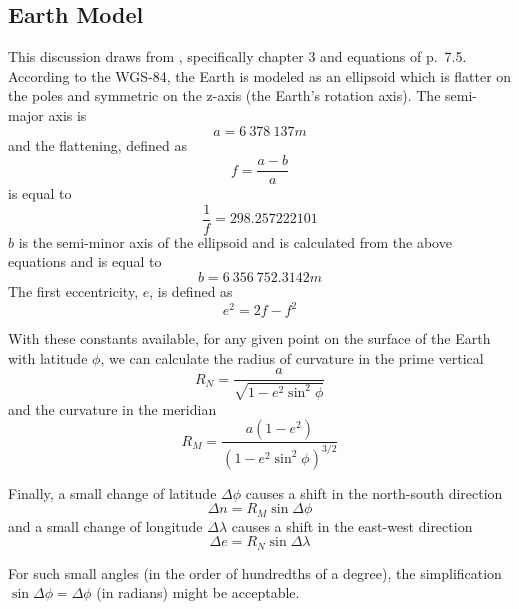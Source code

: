 \subsection{Earth Model}
This discussion draws from \cite{Mulaire2000}, specifically chapter 3 and equations of p.~7.5.
According to the WGS-84, the Earth is modeled as an ellipsoid which is flatter on the poles and symmetric on the z-axis (the Earth's rotation axis). The semi-major axis is
\begin{equation}\label{eq:majorAxis}
	a=6~378~137m
\end{equation}
and the flattening, defined as
\begin{equation}
	f = \frac{a-b}{a}
\end{equation}
is equal to
\begin{equation}
	\frac{1}{f} = 298.257222101
\end{equation}
$b$ is the semi-minor axis of the ellipsoid and is calculated from the above equations and is equal to
\begin{equation}
	b=6~356~752.3142m
\end{equation}
The first eccentricity, $e$, is defined as
\begin{equation}
	e^2=2f-f^2
\end{equation}

With these constants available, for any given point on the surface of the Earth with latitude $\phi$, we can calculate the radius of curvature in the prime vertical
\begin{equation}
	R_N=\frac{a}{\sqrt{1-e^2\sin^2\phi}}
\end{equation}
and the curvature in the meridian
\begin{equation}
	R_M = \frac{a(1-e^2)}{(1-e^2\sin^2\phi)^{3/2}}
\end{equation}

Finally, a small change of latitude $\Delta \phi$ causes a shift in the north-south direction
\begin{equation}
	\Delta n = R_M \sin \Delta \phi
\end{equation}
and a small change of longitude $\Delta \lambda$ causes a shift in the east-west direction
\begin{equation}
	\Delta e = R_N \sin \Delta \lambda
\end{equation}

For such small angles (in the order of hundredths of a degree), the simplification $\sin \Delta \phi = \Delta \phi$ (in radians) might be acceptable.

